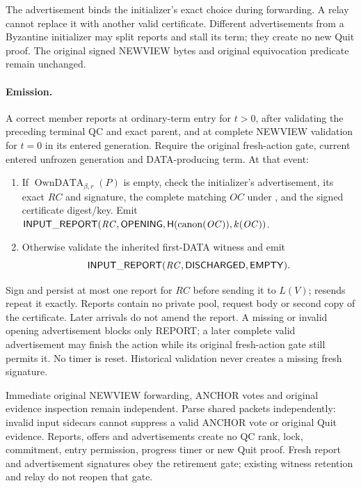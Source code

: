 The advertisement binds the initializer's exact choice during forwarding.
A relay cannot replace it with another valid certificate. Different
advertisements from a Byzantine initializer may split reports and stall
its term; they create no new Quit proof. The original signed NEWVIEW
bytes and original equivocation predicate remain unchanged.

\paragraph{Emission.}
A correct member reports at ordinary-term entry for $t>0$, after validating
the preceding terminal QC and exact parent, and at complete NEWVIEW
validation for $t=0$ in its entered generation. Require the original
fresh-action gate, current entered unfrozen generation and DATA-producing
term. At that event:
\begin{enumerate}[label=(\roman*),itemsep=2pt]
\item If $\operatorname{OwnDATA}_{\beta,r}(P)$ is empty, check the
initializer's advertisement, its exact $\mathit{RC}$ and signature,
the complete matching $\mathit{OC}$ under , and the signed
certificate digest/key. Emit
$\mathsf{INPUT\_REPORT}(\mathit{RC},\mathsf{OPENING},
\mathsf H(\operatorname{canon}(\mathit{OC})),k(\mathit{OC}))$.
\item Otherwise validate the inherited first-DATA witness and emit
\[
 \mathsf{INPUT\_REPORT}(\mathit{RC},\mathsf{DISCHARGED},\mathsf{EMPTY}).
\]
\end{enumerate}
Sign and persist at most one report for $\mathit{RC}$ before sending it
to $L(V)$; resends repeat it exactly. Reports contain no private pool,
request body or second copy of the certificate. Later arrivals do not
amend the report. A missing or invalid opening advertisement blocks only
REPORT; a later complete valid advertisement may finish the action while
its original fresh-action gate still permits it. No timer is reset.
Historical validation never creates a missing fresh signature.

Immediate original NEWVIEW forwarding, ANCHOR votes and original evidence
inspection remain independent. Parse shared packets independently:
invalid input sidecars cannot suppress a valid ANCHOR vote or original
Quit evidence. Reports, offers and advertisements create no QC rank,
lock, commitment, entry permission, progress timer or new Quit proof.
Fresh report and advertisement signatures obey the retirement gate;
existing witness retention and relay do not reopen that gate.

